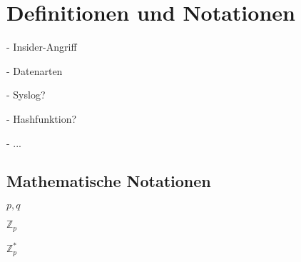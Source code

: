 \section{Definitionen und Notationen}

\label{sec_basics_definitions}

- Insider-Angriff

- Datenarten

- Syslog?

- Hashfunktion?

- ...

\subsection{Mathematische Notationen}

\(p,q\)

\(\mathbb{Z}_p\)

\(\mathbb{Z}_p^*\)